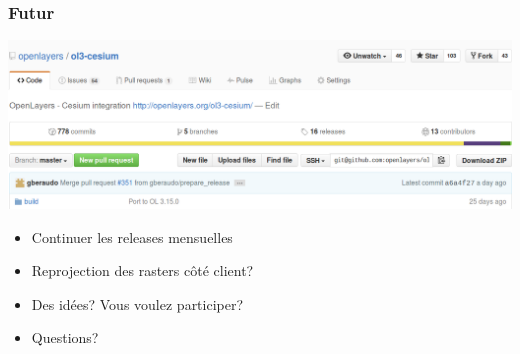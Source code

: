 \documentclass{beamer}
\begin{document}
  \begin{frame}
    \frametitle{Futur}
    \vspace{-20pt}\begin{center}
      \includegraphics[width=0.9\linewidth]{./github2.png}
    \end{center}
    \begin{itemize}
      \item Continuer les releases mensuelles
        \pause
      \item Reprojection des rasters côté client?
        \pause
      \item Des idées? Vous voulez participer?
        \pause
      \item Questions?
    \end{itemize}
  \end{frame}
\end{document}
